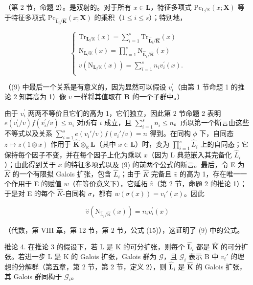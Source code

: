 （第 2 节，命题 2）。是双射的。对于所有 \(x \in \mathbf{L}\)，特征多项式 \(\mathrm{Pc}_{\mathrm{L} / \mathbb{K}}(x; \mathbf{X})\) 等于特征多项式 \(\mathrm{Pc}_{\hat{\mathrm{L}}_i / \hat{\mathbf{K}}}(x; \mathbf{X})\) 的乘积（\(1 \leqslant i \leqslant s\)）；特别地，

\[
\left\{ \begin{array} { l } \mathrm{Tr} _ { \mathbf { L } / \mathbb { K } } ( x ) = \sum _ { i = 1 } ^ { s } \mathrm{Tr} _ { \hat { \mathbf { L } } _ { i } / \hat { \mathbf { K } } } ( x ) \\ \mathrm{N} _ { \mathbf { L } / \mathbb { K } } ( x ) = \prod _ { i = 1 } ^ { s } \mathrm{N} _ { \hat { \mathbf { L } } _ { i } / \hat { \mathbf { K } } } ( x ) \\ v ( \mathrm{N} _ { \mathbf { L } / \mathbb { K } } ( x ) ) = \sum _ { i = 1 } ^ { s } n _ { i } v _ { i } ^ { \prime } ( x ) . \\ \end{array} \right.\tag{9}
\]

（(9) 中最后一个关系是有意义的，因为显然可以假设 \(v_{i}^{\prime}\)（由第 1 节命题 1 的推论 2 知其高为 1）像 \(v\) 一样将其值取在 \(\mathbf{R}\) 的一个子群中。）

由于 \(v_{i}^{\prime}\) 两两不等价且它们的高为 1，它们独立，因此第 2 节命题 2 表明 \(e(v_{i}^{\prime}/v)f(v_{i}^{\prime}/v) \leqslant n_{i}\) 对所有 \(i\) 成立，且 \(\sum_{i=1}^{s} n_i \leqslant n\)。所以第一个断言由这些不等式以及关系 \(\sum_{i=1}^{s} e(v_i'/v) f(v_i'/v) = n\) 得到。在同构 \(\phi\) 下，自同态 \(z \mapsto z(1 \otimes x)\) 作用于 \(\hat{\mathbf{K}} \otimes_{\mathbb{K}} \mathbf{L}\)（其中 \(x \in \mathbf{L}\)）时，变为 \(\prod_{i=1}^{s}\hat{L}_i\) 上的自同态；它保持每个因子不变，并在每个因子上化为乘以 \(x\)（因为 L 典范嵌入其完备化 \(\hat{L}_i\)）；由此得到关于 \(x\) 的特征多项式以及 (9) 的前两个公式的断言。最后，令 E 为 \(\hat{K}\) 的一个有限拟 Galois 扩张，包含 \(\hat{L}_i\)；由于 \(\hat{K}\) 完备且 \(\hat{v}\) 的高为 1，存在唯一一个作用于 E 的赋值 \(w\)（在等价意义下），它延拓 \(\hat{v}\)（第 2 节，命题 2 的推论 1）；于是对 E 的每个 \(\hat{K}\)-自同构 \(\sigma\)，都有 \(w(\sigma(x)) = v_i'(x)\)。因此

\[
\hat {v} \left(\mathrm{N} _ {\hat {\mathrm{L}} _ {i} / \hat {\mathrm{K}}} (x)\right) = n _ {i} v _ {i} ^ {\prime} (x)
\]

（代数，第 VIII 章，第 12 节，第 2 节，公式 (15)），这证明了 (9) 中的公式。

推论 4. 在推论 3 的假设下，若 L 是 K 的可分扩张，则每个 \(\hat{\mathbf{L}}_i\) 都是 \(\hat{\mathbf{K}}\) 的可分扩张。若进一步 L 是 K 的 Galois 扩张，Galois 群为 \(\mathcal{G}\)，且 \(\mathcal{G}_i\) 表示 B 中 \(v_i'\) 的理想的分解群（第五章，第 2 节，第 2 节，定义 2），则 \(\hat{\mathbf{L}}_i\) 是 \(\hat{\mathbf{K}}\) 的 Galois 扩张，其 Galois 群同构于 \(\mathcal{G}_i\)。

